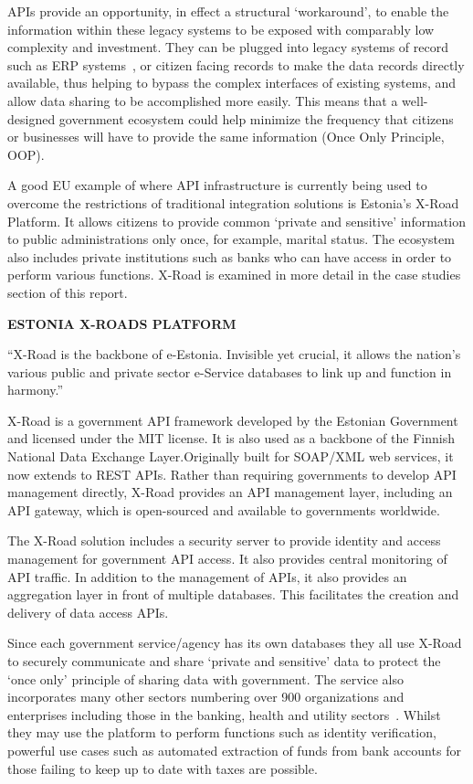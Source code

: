 APIs provide an opportunity, in effect a structural ‘workaround’, to enable the
information within these legacy systems to be exposed with comparably low complexity
and investment. They can be plugged into legacy systems of record such as ERP
systems~\citep{erp_integration}, or citizen facing records to make the data records directly
available, thus helping to bypass the complex interfaces of existing systems,
and allow data sharing to be accomplished more easily. This means that a
well-designed government ecosystem could help minimize the frequency that
citizens or businesses will have to provide the same information (Once Only
Principle, OOP).

A good EU example of where API infrastructure is currently being used to overcome
the restrictions of traditional integration solutions is Estonia’s X-Road Platform.
It allows citizens to provide common ‘private and sensitive’ information to public administrations only once, for example, marital status. The ecosystem also includes
private institutions such as banks who can have access in order to perform various
functions. X-Road is examined in more detail in the case studies section of this report.

\textbf{ESTONIA X-ROADS PLATFORM}

“X-Road is the backbone of e-Estonia. Invisible yet crucial, it allows the
nation’s various public and private sector e-Service databases to link up and
function in harmony.”~\citep{x-road}

X-Road is a government API framework developed by the Estonian Government
and licensed under the MIT license. It is also used as a backbone of the Finnish
National Data Exchange Layer.Originally built for SOAP/XML web services, it now
extends to REST APIs. Rather than requiring governments to develop API management
directly, X-Road provides an API management layer, including an API gateway,
which is open-sourced and available to governments worldwide.~\citep{gov_transformation}

The X-Road solution includes a security server to provide identity and access
management for government API access. It also provides central monitoring of
API traffic. In addition to the management of APIs, it also provides an
aggregation layer in front of multiple databases. This facilitates the creation
and delivery of data access APIs.

Since each government service/agency has its own databases they all use X-Road
to securely communicate and share ‘private and sensitive’ data to protect the
‘once only’ principle of sharing data with government. The service also incorporates
many other sectors numbering over 900 organizations and enterprises including those
in the banking, health and utility sectors~\cite{x-road}. Whilst they may use the platform to
perform functions such as identity verification, powerful use cases such as automated extraction of funds from bank accounts for those failing to keep up to date with
taxes are possible.

